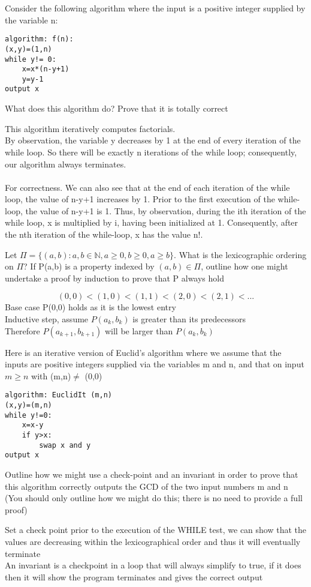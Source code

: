\documentclass[addpoints]{exam}
\begin{document}
\begin{questions}
\question[7]Consider the following algorithm where the input is a positive integer supplied by the variable n:
\begin{lstlisting}
algorithm: f(n):
(x,y)=(1,n)
while y!= 0:
	x=x*(n-y+1)
	y=y-1
output x
\end{lstlisting}
What does this algorithm do? Prove that it is totally correct
\begin{solution}[2in]
This algorithm iteratively computes factorials.\\
By observation, the variable y decreases by 1 at the end of every iteration of the while loop. So there will be exactly n iterations of the while loop; consequently, our algorithm always terminates.\\
\\
For correctness. We can also see that at the end of each iteration of the while loop, the value of n-y+1 increases by 1. Prior to the first execution of the while-loop, the value of n-y+1 is 1. Thus, by observation, during the ith iteration of the while loop, x is multiplied by i, having been initialized at 1. Consequently, after the nth iteration of the while-loop, x has the value n!. 
\end{solution}

\question[4]Let $\Pi = \{ ( a , b ) : a , b \in \mathbb { N } , a \geq 0 , b \geq 0 , a \geq b \}$. What is the lexicographic ordering on $\Pi$? If P(a,b) is a property indexed by $(a,b)\in \Pi$, outline how one might undertake a proof by induction to prove that P always hold
\begin{solution}[2in]
	$$(0,0)<(1,0)<(1,1)<(2,0)<(2,1)<...$$
	Base case P(0,0) holds as it is the lowest entry\\
	Inductive step, assume $P(a_k,b_k)$ is greater than its predecessors\\
	Therefore $P(a_{k+1},b_{k+1})$ will be larger than $P(a_k,b_k)$
\end{solution}


\question[6]
Here is an iterative version of Euclid's algorithm where we assume that the inputs are positive integers supplied via the variables m and n, and that on input $m\geqslant n$ with (m,n)$\neq$ (0,0)
\begin{lstlisting}
algorithm: EuclidIt (m,n)
(x,y)=(m,n)
while y!=0:
	x=x-y
	if y>x:
		swap x and y
output x
\end{lstlisting}
Outline how we might use a check-point and an invariant in order to prove that this algorithm correctly outputs the GCD of the two input numbers m and n (You should only outline how we might do this; there is no need to provide a full proof)
\begin{solution}[2in]
	Set a check point prior to the execution of the WHILE test, we can show that the values are decreasing within the lexicographical order and thus it will eventually terminate\\
	An invariant is a checkpoint in a loop that will always simplify to true, if it does then it will show the program terminates and gives the correct output
\end{solution}


\end{questions}
\end{document}
